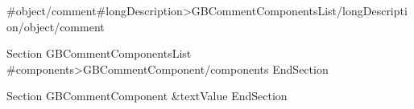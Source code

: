 {{#object/comment}}{{#longDescription}}{{>GBCommentComponentsList}}{{/longDescription}}{{/object/comment}}


Section GBCommentComponentsList
{{#components}}{{>GBCommentComponent}}{{/components}}
EndSection

Section GBCommentComponent
{{&textValue}}
EndSection
